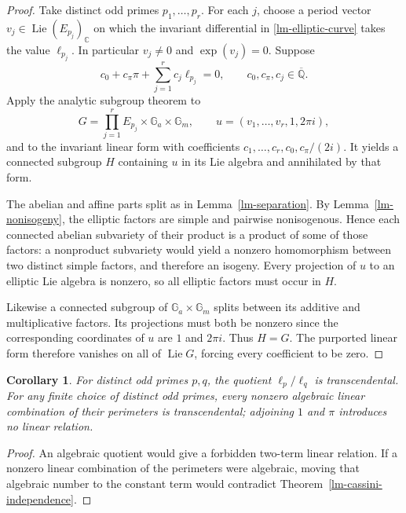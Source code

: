 \documentclass[11pt,a4paper]{article}
\newtheorem{corollary}[theorem]{Corollary}
\theoremstyle{definition}
\theoremstyle{remark}
\numberwithin{equation}{section}
\newcommand{\Qbar}{\overline{\mathbb Q}}
\begin{document}
\begin{proof}
Take distinct odd primes $p_1,\ldots,p_r$.  For each $j$, choose a period
vector $v_j\in\operatorname{Lie}(E_{p_j})_{\mathbb C}$ on which the
invariant differential in \eqref{lm-elliptic-curve} takes the value
$\ell_{p_j}$.  In particular $v_j\ne0$ and $\exp(v_j)=0$.
Suppose
\[
 c_0+c_\pi\pi+\sum_{j=1}^r c_j\ell_{p_j}=0,
 \qquad c_0,c_\pi,c_j\in\Qbar.
\]
Apply the analytic subgroup theorem to
\[
 G=\prod_{j=1}^r E_{p_j}\times\mathbb G_a\times\mathbb G_m,
 \qquad u=(v_1,\ldots,v_r,1,2\pi i),
\]
and to the invariant linear form with coefficients
$c_1,\ldots,c_r,c_0,c_\pi/(2i)$.  It yields a connected subgroup $H$
containing $u$ in its Lie algebra and annihilated by that form.

The abelian and affine parts split as in
Lemma~\ref{lm-separation}.  By Lemma~\ref{lm-nonisogeny}, the elliptic
factors are simple and pairwise nonisogenous.  Hence each connected
abelian subvariety of their product is a product of some of those
factors: a nonproduct subvariety would yield a nonzero homomorphism
between two distinct simple factors, and therefore an isogeny.  Every
projection of $u$ to an elliptic Lie algebra is nonzero, so all elliptic
factors must occur in $H$.

Likewise a connected subgroup of $\mathbb G_a\times\mathbb G_m$ splits
between its additive and multiplicative factors.  Its projections must
both be nonzero since the corresponding coordinates of $u$ are $1$ and
$2\pi i$.  Thus $H=G$.  The purported linear form therefore vanishes on
all of $\operatorname{Lie}G$, forcing every coefficient to be zero.
\end{proof}

\begin{corollary}\label{lm-cassini-ratios}
For distinct odd primes $p,q$, the quotient $\ell_p/\ell_q$ is
transcendental.  For any finite choice of distinct odd primes, every
nonzero algebraic linear combination of their perimeters is
transcendental; adjoining $1$ and $\pi$ introduces no linear relation.
\end{corollary}

\begin{proof}
An algebraic quotient would give a forbidden two-term linear relation.
If a nonzero linear combination of the perimeters were algebraic, moving
that algebraic number to the constant term would contradict
Theorem~\ref{lm-cassini-independence}.
\end{proof}
\end{document}
